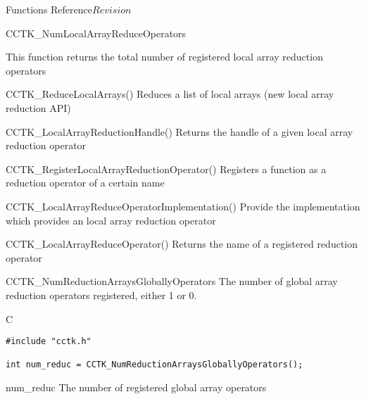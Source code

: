 \begin{cactuspart}{ Functions Reference}{}{$Revision$}
\begin{FunctionDescription}{CCTK\_NumLocalArrayReduceOperators}
\begin{Discussion}
This function returns the total number of registered local array
reduction operators
\end{Discussion}

\begin{SeeAlsoSection}
\begin{SeeAlso}{CCTK\_ReduceLocalArrays()}
Reduces a list of local arrays (new local array reduction API)
\end{SeeAlso}

\begin{SeeAlso}{CCTK\_LocalArrayReductionHandle()}
Returns the handle of a given local array reduction operator
\end{SeeAlso}

\begin{SeeAlso}{CCTK\_RegisterLocalArrayReductionOperator()}
Registers a function as a reduction operator of a certain name
\end{SeeAlso}

\begin{SeeAlso}{CCTK\_LocalArrayReduceOperatorImplementation()}
Provide the implementation which provides an local array reduction operator
\end{SeeAlso}

\begin{SeeAlso}{CCTK\_LocalArrayReduceOperator()}
Returns the name of a registered reduction operator
\end{SeeAlso}

\end{SeeAlsoSection}
\end{FunctionDescription}

\begin{FunctionDescription}{CCTK\_NumReductionArraysGloballyOperators}
\label{CCTK-NumReductionArraysGloballyOperators}
The number of global array reduction operators registered, either 1 or 0.

\begin{SynopsisSection}
\begin{Synopsis}{C}
\begin{verbatim}
#include "cctk.h"

int num_reduc = CCTK_NumReductionArraysGloballyOperators();
\end{verbatim}
\end{Synopsis}
\end{SynopsisSection}

\begin{ResultSection}
\begin{Result}{num\_reduc}
The number of registered global array operators
\end{Result}
\end{ResultSection}


\end{FunctionDescription}
\end{cactuspart}
